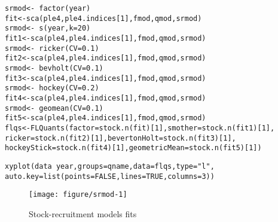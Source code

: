 \documentclass[a4paper,english,10pt]{article}\usepackage[]{graphicx}\usepackage[]{color}
\makeatletter
\def\maxwidth{ %
  \ifdim\Gin@nat@width>\linewidth
    \linewidth
  \else
    \Gin@nat@width
  \fi
}
\newcommand{\hlnum}[1]{\textcolor[rgb]{0.2,0.2,0.2}{#1}}%
\newcommand{\hlstr}[1]{\textcolor[rgb]{0.2,0.2,0.2}{#1}}%
\newcommand{\hlopt}[1]{\textcolor[rgb]{0.2,0.2,0.2}{#1}}%
\newcommand{\hlstd}[1]{\textcolor[rgb]{0,0,0}{#1}}%
\newcommand{\hlkwb}[1]{\textcolor[rgb]{0.361,0.506,0.596}{#1}}%
\newcommand{\hlkwc}[1]{\textcolor[rgb]{0.361,0.506,0.596}{#1}}%
\newcommand{\hlkwd}[1]{\textcolor[rgb]{0.361,0.506,0.596}{#1}}%
\newenvironment{kframe}{%
 \def\at@end@of@kframe{}%
 \ifinner\ifhmode%
  \def\at@end@of@kframe{\end{minipage}}%
  \begin{minipage}{\columnwidth}%
 \fi\fi%
 \def\FrameCommand##1{\hskip\@totalleftmargin \hskip-\fboxsep
 \colorbox{shadecolor}{##1}\hskip-\fboxsep
     \hskip-\linewidth \hskip-\@totalleftmargin \hskip\columnwidth}%
 \MakeFramed {\advance\hsize-\width
   \@totalleftmargin\z@ \linewidth\hsize
   \@setminipage}}%
 {\par\unskip\endMakeFramed%
 \at@end@of@kframe}
\newenvironment{knitrout}{}{} %
\makeatother
\begin{document}
\begin{knitrout}
\color{fgcolor}\begin{kframe}
\begin{alltt}
\hlstd{srmod} \hlkwb{<-} \hlopt{~} \hlkwd{factor}\hlstd{(year)}
\hlstd{fit} \hlkwb{<-} \hlkwd{sca}\hlstd{(ple4, ple4.indices[}\hlnum{1}\hlstd{], fmod, qmod, srmod)}
\hlstd{srmod} \hlkwb{<-} \hlopt{~} \hlkwd{s}\hlstd{(year,} \hlkwc{k}\hlstd{=}\hlnum{20}\hlstd{)}
\hlstd{fit1} \hlkwb{<-} \hlkwd{sca}\hlstd{(ple4, ple4.indices[}\hlnum{1}\hlstd{], fmod, qmod, srmod)}
\hlstd{srmod} \hlkwb{<-} \hlopt{~} \hlkwd{ricker}\hlstd{(}\hlkwc{CV}\hlstd{=}\hlnum{0.1}\hlstd{)}
\hlstd{fit2} \hlkwb{<-} \hlkwd{sca}\hlstd{(ple4, ple4.indices[}\hlnum{1}\hlstd{], fmod, qmod, srmod)}
\hlstd{srmod} \hlkwb{<-} \hlopt{~} \hlkwd{bevholt}\hlstd{(}\hlkwc{CV}\hlstd{=}\hlnum{0.1}\hlstd{)}
\hlstd{fit3} \hlkwb{<-} \hlkwd{sca}\hlstd{(ple4, ple4.indices[}\hlnum{1}\hlstd{], fmod, qmod, srmod)}
\hlstd{srmod} \hlkwb{<-} \hlopt{~} \hlkwd{hockey}\hlstd{(}\hlkwc{CV}\hlstd{=}\hlnum{0.2}\hlstd{)}
\hlstd{fit4} \hlkwb{<-} \hlkwd{sca}\hlstd{(ple4, ple4.indices[}\hlnum{1}\hlstd{], fmod, qmod, srmod)}
\hlstd{srmod} \hlkwb{<-} \hlopt{~} \hlkwd{geomean}\hlstd{(}\hlkwc{CV}\hlstd{=}\hlnum{0.1}\hlstd{)}
\hlstd{fit5} \hlkwb{<-} \hlkwd{sca}\hlstd{(ple4, ple4.indices[}\hlnum{1}\hlstd{], fmod, qmod, srmod)}
\hlstd{flqs} \hlkwb{<-} \hlkwd{FLQuants}\hlstd{(}\hlkwc{factor}\hlstd{=}\hlkwd{stock.n}\hlstd{(fit)[}\hlnum{1}\hlstd{],} \hlkwc{smother}\hlstd{=}\hlkwd{stock.n}\hlstd{(fit1)[}\hlnum{1}\hlstd{],}
                 \hlkwc{ricker}\hlstd{=}\hlkwd{stock.n}\hlstd{(fit2)[}\hlnum{1}\hlstd{],} \hlkwc{bevertonHolt}\hlstd{=}\hlkwd{stock.n}\hlstd{(fit3)[}\hlnum{1}\hlstd{],}
                 \hlkwc{hockeyStick}\hlstd{=}\hlkwd{stock.n}\hlstd{(fit4)[}\hlnum{1}\hlstd{],} \hlkwc{geometricMean}\hlstd{=}\hlkwd{stock.n}\hlstd{(fit5)[}\hlnum{1}\hlstd{])}
\end{alltt}
\end{kframe}
\end{knitrout}

\begin{knitrout}
\color{fgcolor}\begin{kframe}
\begin{alltt}
\hlkwd{xyplot}\hlstd{(data}\hlopt{~}\hlstd{year,} \hlkwc{groups}\hlstd{=qname,} \hlkwc{data}\hlstd{=flqs,} \hlkwc{type}\hlstd{=}\hlstr{"l"}\hlstd{,}
       \hlkwc{auto.key}\hlstd{=}\hlkwd{list}\hlstd{(}\hlkwc{points}\hlstd{=}\hlnum{FALSE}\hlstd{,} \hlkwc{lines}\hlstd{=}\hlnum{TRUE}\hlstd{,} \hlkwc{columns}\hlstd{=}\hlnum{3}\hlstd{))}
\end{alltt}
\end{kframe}\begin{figure}[H]

{\centering \texttt{[image: figure/srmod-1]} 

}

\caption[Stock-recruitment models fits]{Stock-recruitment models fits}\label{fig:srmod}
\end{figure}


\end{knitrout}
\end{document}
